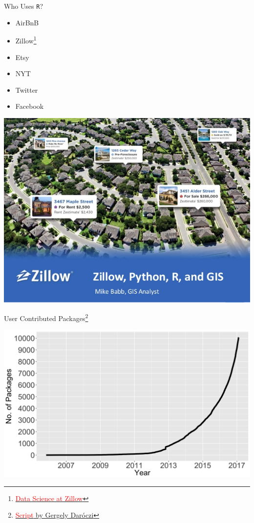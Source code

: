 \documentclass[aspectratio=169]{beamer}\usepackage[]{graphicx}\usepackage[]{color}
\begin{document}

\begin{frame}{Who Uses \texttt{R}?}
\begin{multicols}{2}
  \begin{itemize}
    \item AirBnB
    \item Zillow\footnote{\href{http://www.slideshare.net/NicholasMcClure1/python-datascienceatzillow}{\textcolor{red}{Data Science at Zillow}}}
    \item Etsy
    \item NYT
    \item Twitter
    \item Facebook
  \end{itemize}
\columnbreak
\includegraphics[scale = 0.25]{data-science-at-zillow-29-638.jpg}
\end{multicols}

\end{frame}


\begin{frame}{User Contributed Packages\footnote{\href{gist.github.com/daroczig/}{\textcolor{red}{Script} by Gergely Dar\'{o}czi}}}
\begin{center}
  \includegraphics[scale = 0.1]{CRANpkgTrends.jpg}
\end{center}
\end{frame}
\end{document}
